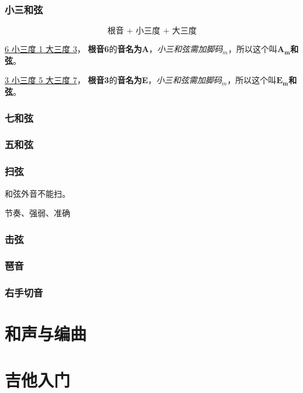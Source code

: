 \documentclass[UTF8,a4paper,12pt]{ctexbook}
\begin{document}
		\subsection{小三和弦}
			$$ \textbf{根音 +  小三度 + 大三度} $$
	
			\underline{6 小三度 1  大三度 3}， \textbf{根音6}的\textbf{音名为A}，\textit{小三和弦需加脚码}$_m$，所以这个叫\textbf{$\mathbf{A_m}$和弦}。
			
			\underline{3 小三度 5  大三度 7}， \textbf{根音3}的\textbf{音名为E}，\textit{小三和弦需加脚码}$_m$，所以这个叫\textbf{$\mathbf{E_m}$和弦}。
		
		
		\subsection{七和弦}
		
		\subsection{五和弦}
			
		\subsection{扫弦}
			和弦外音不能扫。
			
			节奏、强弱、准确
			
		\subsection{击弦}
		
		\subsection{琶音}
		
		\subsection{右手切音}
		
		
\chapter{和声与编曲}

\chapter{吉他入门}
		    
\end{document}
